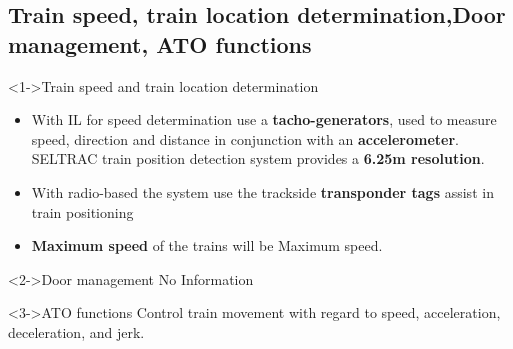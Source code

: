 
\subsection{Train speed, train location determination,Door management, ATO functions}
\frame
{
   \begin{block}<1->{Train speed and train location determination}
      \begin{itemize}
       \item With IL for speed determination use a \textbf{tacho-generators}, used to measure speed, direction and distance in conjunction with an \textbf{accelerometer}. SELTRAC train position detection system provides a \textbf{6.25m resolution}.

\item With radio-based the system use the trackside \textbf{transponder tags} assist in train positioning

\item \textbf{Maximum speed} of the trains will be Maximum speed.

\end{itemize}



   \end{block}


\begin{block}<2->{Door management}
No Information

   \end{block}
   
   \begin{block}<3->{ATO functions}
  Control train movement with regard to speed, acceleration, deceleration, and jerk.
   \end{block}
   
   }



